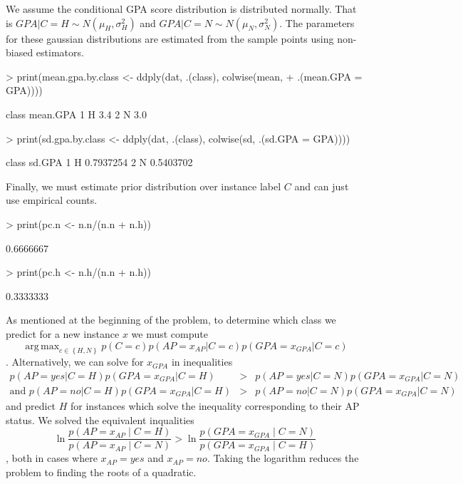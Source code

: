 \documentclass[12pt]{article}
\DeclareMathOperator*{\argmax}{arg\,max}
\begin{document}
\begin{Schunk}
We assume the conditional GPA score distribution is distributed normally.
That is $GPA|C=H \sim N(\mu_H,\sigma_H^2)$ and $GPA|C=N \sim N(\mu_N,\sigma_N^2)$.
The parameters for these gaussian distributions are estimated from the sample points using non-biased estimators.
\begin{Sinput}
> print(mean.gpa.by.class <- ddply(dat, .(class), colwise(mean, 
+     .(mean.GPA = GPA))))
\end{Sinput}
\begin{Soutput}
  class mean.GPA
1     H      3.4
2     N      3.0
\end{Soutput}
\begin{Sinput}
> print(sd.gpa.by.class <- ddply(dat, .(class), colwise(sd, .(sd.GPA = GPA))))
\end{Sinput}
\begin{Soutput}
  class    sd.GPA
1     H 0.7937254
2     N 0.5403702
\end{Soutput}
\end{Schunk}

Finally, we must estimate prior distribution over instance label $C$ and can just use empirical counts.
\begin{Schunk}
\begin{Sinput}
> print(pc.n <- n.n/(n.n + n.h))
\end{Sinput}
\begin{Soutput}
[1] 0.6666667
\end{Soutput}
\begin{Sinput}
> print(pc.h <- n.h/(n.n + n.h))
\end{Sinput}
\begin{Soutput}
[1] 0.3333333
\end{Soutput}
\end{Schunk}

As mentioned at the beginning of the problem, to determine which class we predict for a new instance $x$ we must compute
\[\argmax_{c\in\left\{ H,N \right\}} p(C=c)p(AP=x_{AP}|C=c)p(GPA=x_{GPA}|C=c)\].
Alternatively, we can solve for $x_{GPA}$ in inequalities
\begin{eqnarray*}
    p(AP=yes|C=H)p(GPA=x_{GPA}|C=H) &>& p(AP=yes|C=N)p(GPA=x_{GPA}|C=N) \\
    \text{and } p(AP=no|C=H)p(GPA=x_{GPA}|C=H) &>& p(AP=no|C=N)p(GPA=x_{GPA}|C=N)
\end{eqnarray*} and predict $H$ for instances which solve the inequality corresponding to their AP status.
We solved the equivalent inqualities
\begin{equation}
    \ln \frac{p(AP=x_{AP} \mid C=H)}{p(AP=x_{AP} \mid C=N)}
    > \ln \frac{p(GPA=x_{GPA} \mid C=N)}{p(GPA=x_{GPA} \mid C=H)}
    \label{equation: interval constraint}
\end{equation}, both in cases where $x_{AP}=yes$ and $x_{AP}=no$.
Taking the logarithm reduces the problem to finding the roots of a quadratic.
\end{document}
